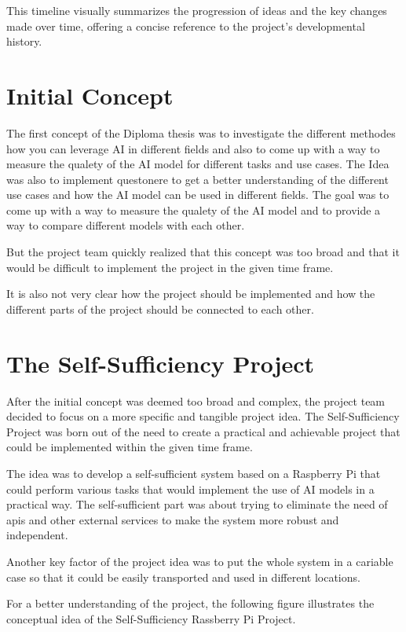 This timeline visually summarizes the progression of ideas and the key changes made over time, offering a concise reference to the project's developmental history.



\section{Initial Concept}

The first concept of the Diploma thesis was to investigate the different methodes how you can leverage AI in different fields 
and also to come up with a way to measure the qualety of the AI model for different tasks and use cases.
The Idea was also to implement questonere to get a better understanding of the different use cases and how the AI model can be used in different fields.
The goal was to come up with a way to measure the qualety of the AI model and to provide a way to compare different models with each other.

But the project team quickly realized that this concept was too broad and that it would be difficult to implement the project in the given time frame.

It is also not very clear how the project should be implemented and how the different parts of the project should be connected to each other.

\section{The Self-Sufficiency Project}

After the initial concept was deemed too broad and complex, the project team decided to focus on a more specific and tangible project idea. 
The Self-Sufficiency Project was born out of the need to create a practical and achievable project that could be implemented within the given time frame.

The idea was to develop a self-sufficient system based on a Raspberry Pi that could perform various tasks that would implement the use of AI models in a practical way.
The self-sufficient part was about trying to eliminate the need of apis and other external services to make the system more robust and independent.

Another key factor of the project idea was to put the whole system in a cariable case so that it could be easily transported and used in different locations.

For a better understanding of the project, the following figure illustrates the conceptual idea of the Self-Sufficiency Rassberry Pi Project.

